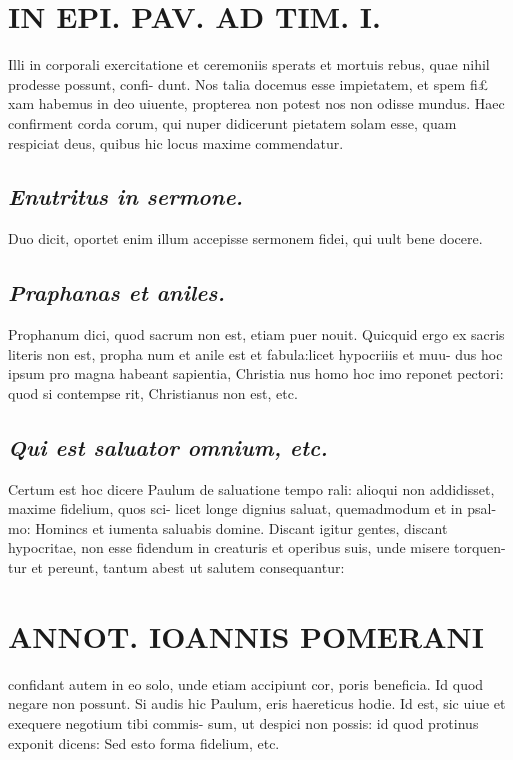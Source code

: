 \documentclass{article}
\begin{document}
\begin{pages}
\section*{IN EPI. PAV. AD TIM. I. }
\marginpar{[ p.92 ]}\pstart Illi in corporali exercitatione et ceremoniis sperats et mortuis rebus, quae nihil prodesse possunt, confi- dunt. Nos talia docemus esse impietatem, et spem fi£ xam habemus in deo uiuente, propterea non potest nos non odisse mundus. Haec confirment corda corum, qui nuper didicerunt pietatem solam esse, quam respiciat deus, quibus hic locus maxime commendatur.  \pend
{}
{}
\subsection*{\textit{Enutritus in sermone. }}\pstart Duo dicit, oportet enim illum accepisse sermonem fidei, qui uult bene docere.  \pend
{}
{}
\subsection*{\textit{Praphanas et aniles. }}\pstart Prophanum dici, quod sacrum non est, etiam puer nouit. Quicquid ergo ex sacris literis non est, propha num et anile est et fabula:licet hypocriiis et muu- dus hoc ipsum pro magna habeant sapientia, Christia nus homo hoc imo reponet pectori: quod si contempse rit, Christianus non est, etc.  \pend
{}
{}
\subsection*{\textit{Qui est saluator omnium, etc. }}\pstart Certum est hoc dicere Paulum de saluatione tempo rali: alioqui non addidisset, maxime fidelium, quos sci- licet longe dignius saluat, quemadmodum et in psal- mo: Homincs et iumenta saluabis domine. Discant igitur gentes, discant hypocritae, non esse fidendum in creaturis et operibus suis, unde misere torquen- tur et pereunt, tantum abest ut salutem consequantur:  \pend
\section*{ANNOT. IOANNIS POMERANI }\pstart confidant autem in eo solo, unde etiam accipiunt cor, poris beneficia. Id quod negare non possunt.  \pend\pstart Si audis hic Paulum, eris haereticus hodie.  \pend\pstart Id est, sic uiue et exequere negotium tibi commis- sum, ut despici non possis: id quod protinus exponit dicens: Sed esto forma fidelium, etc.  \pend
{}
{}

\end{pages}
\end{document}
